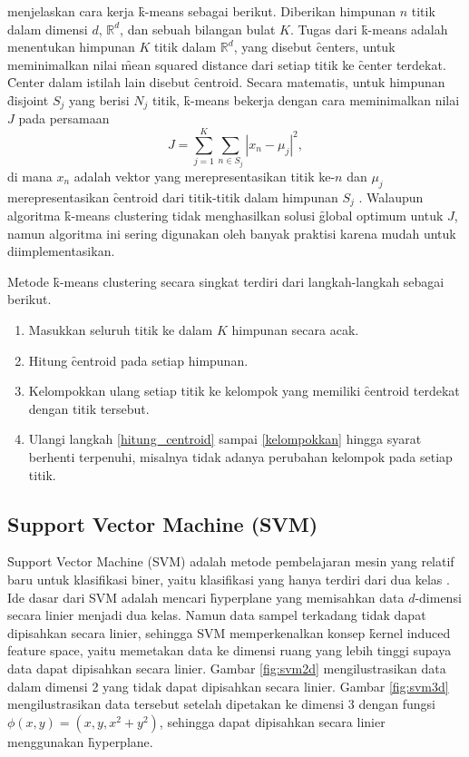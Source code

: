   \cite{kanungo2002efficient} menjelaskan cara kerja \f{k-means} sebagai berikut. Diberikan himpunan $n$ titik dalam dimensi $d$, $\mathbb{R}^d$, dan sebuah bilangan bulat $K$. Tugas dari \f{k-means} adalah menentukan himpunan $K$ titik dalam $\mathbb{R}^d$, yang disebut \f{centers}, untuk meminimalkan nilai \f{mean squared distance} dari setiap titik ke \f{center} terdekat. \f{Center} dalam istilah lain disebut \f{centroid}. Secara matematis, untuk himpunan \f{disjoint} $S_j$ yang berisi $N_j$ titik, \f{k-means} bekerja dengan cara meminimalkan nilai $J$ pada persamaan
  \begin{equation}
    J = \sum_{j=1}^{K}{\sum_{n\in S_j}{|x_n-\mu_j|^2}},
  \end{equation}
  di mana $x_n$ adalah vektor yang merepresentasikan titik ke-$n$ dan $\mu_j$ merepresentasikan \f{centroid} dari titik-titik dalam himpunan $S_j$ \citep{kmeans}. Walaupun algoritma \f{k-means clustering} tidak menghasilkan solusi \f{global optimum} untuk $J$, namun algoritma ini sering digunakan oleh banyak praktisi karena mudah untuk diimplementasikan.

  Metode \f{k-means clustering} secara singkat terdiri dari langkah-langkah sebagai berikut.
  \begin{enumerate}
    \item Masukkan seluruh titik ke dalam $K$ himpunan secara acak.
    \item \label{hitung_centroid} Hitung \f{centroid} pada setiap himpunan.
    \item \label{kelompokkan} Kelompokkan ulang setiap titik ke kelompok yang memiliki \f{centroid} terdekat dengan titik tersebut.
    \item Ulangi langkah \ref{hitung_centroid} sampai \ref{kelompokkan} hingga syarat berhenti terpenuhi, misalnya tidak adanya perubahan kelompok pada setiap titik.
  \end{enumerate}



  \subsection{Support Vector Machine (SVM)}
  \f{Support Vector Machine} (SVM) adalah metode pembelajaran mesin yang relatif baru untuk klasifikasi biner, yaitu klasifikasi yang hanya terdiri dari dua kelas \citep{svm}. Ide dasar dari SVM adalah mencari \f{hyperplane} yang memisahkan data $d$-dimensi secara linier menjadi dua kelas. Namun data sampel terkadang tidak dapat dipisahkan secara linier, sehingga SVM memperkenalkan konsep \f{kernel induced feature space}, yaitu memetakan data ke dimensi ruang yang lebih tinggi supaya data dapat dipisahkan secara linier. Gambar \ref{fig:svm2d} mengilustrasikan data dalam dimensi 2 yang tidak dapat dipisahkan secara linier. Gambar \ref{fig:svm3d} mengilustrasikan data tersebut setelah dipetakan ke dimensi 3 dengan fungsi $\phi(x,y)=(x,y,x^2+y^2)$, sehingga dapat dipisahkan secara linier menggunakan \f{hyperplane}.

